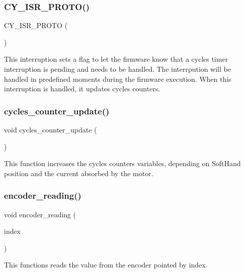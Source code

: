\subsubsection{C\+Y\+\_\+\+I\+S\+R\+\_\+\+P\+R\+O\+T\+O()\hspace{0.1cm}{\footnotesize\ttfamily [3/3]}}
{\footnotesize\ttfamily C\+Y\+\_\+\+I\+S\+R\+\_\+\+P\+R\+O\+TO (\begin{DoxyParamCaption}\item[{I\+S\+R\+\_\+\+C\+Y\+C\+L\+E\+S\+\_\+\+Handler}]{ }\end{DoxyParamCaption})}

This interruption sets a flag to let the firmware know that a cycles timer interruption is pending and needs to be handled. The interrpution will be handled in predefined moments during the firmware execution. When this interruption is handled, it updates cycles counters. \mbox{\label{interruptions_8h_a77877c16b42f6f384f7c80d3002aed22}} 
\subsubsection{cycles\+\_\+counter\+\_\+update()}
{\footnotesize\ttfamily void cycles\+\_\+counter\+\_\+update (\begin{DoxyParamCaption}{ }\end{DoxyParamCaption})}

This function increases the cycles counters variables, depending on Soft\+Hand position and the current absorbed by the motor. \mbox{\label{interruptions_8h_a02aa2fd33f7b2f645490b9c7642084d7}} 
\subsubsection{encoder\+\_\+reading()}
{\footnotesize\ttfamily void encoder\+\_\+reading (\begin{DoxyParamCaption}\item[{const uint8}]{index }\end{DoxyParamCaption})}

This functions reads the value from the encoder pointed by index.


